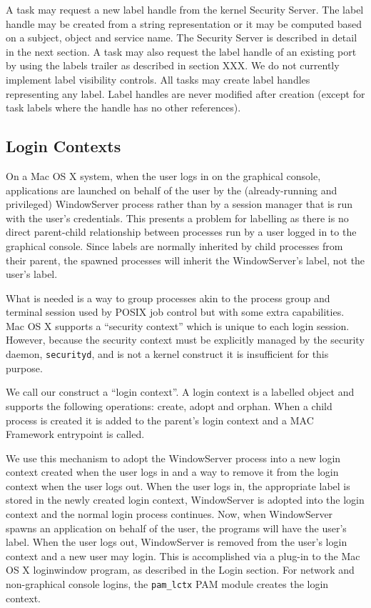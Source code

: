 A task may request a new label handle from the kernel Security
Server.  The label handle may be created from a string representation
or it may be computed based on a subject, object and service name.
The Security Server is described in detail in the next section.  A
task may also request the label handle of an existing port by using
the labels trailer as described in section XXX.  We do not currently
implement label visibility controls.  All tasks may create label
handles representing any label.  Label handles are never modified
after creation (except for task labels where the handle has no other
references).

\subsection{Login Contexts}

On a Mac OS X system, when the user logs in on the graphical console,
applications are launched on behalf of the user by the (already-running
and privileged) WindowServer process rather than by a session manager
that is run with the user's credentials.  This presents a problem
for labelling as there is no direct parent-child relationship between
processes run by a user logged in to the graphical console.  Since
labels are normally inherited by child processes from their parent,
the spawned processes will inherit the WindowServer's label, not
the user's label.

What is needed is a way to group processes akin to the process group
and terminal session used by POSIX job control but with some extra
capabilities.  Mac OS X supports a ``security context'' which is
unique to each login session\cite{securitycontext}.  However, because
the security context must be explicitly managed by the security
daemon, {\tt securityd}, and is not a kernel construct it is
insufficient for this purpose.

We call our construct a ``login context''.  A login context is a
labelled object and supports the following operations: create, adopt
and orphan.  When a child process is created it is added to the
parent's login context and a MAC Framework entrypoint is called.

We use this mechanism to adopt the WindowServer process into a new
login context created when the user logs in and a way to remove it
from the login context when the user logs out.  When the user logs
in, the appropriate label is stored in the newly created login
context, WindowServer is adopted into the login context and the
normal login process continues.  Now, when WindowServer spawns an
application on behalf of the user, the programs will have the user's
label.  When the user logs out, WindowServer is removed from the
user's login context and a new user may login.  This is accomplished
via a plug-in to the Mac OS X loginwindow program, as described in
the Login section.  For network and non-graphical console logins,
the {\tt pam\_lctx} PAM module creates the login context.

